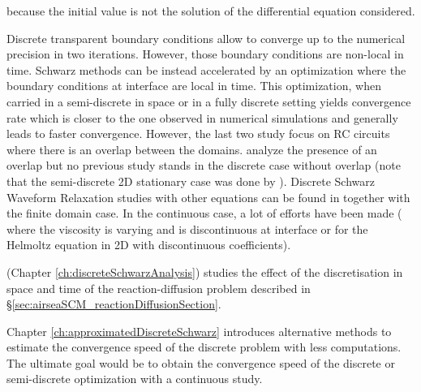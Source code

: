 because the initial value is not the solution of the
differential equation considered.
\par
Discrete transparent boundary conditions
\citep{zisowsky_discrete_2006} allow to converge up to the
numerical precision in two iterations.
However, those boundary conditions are non-local in time.
Schwarz methods can be instead accelerated
by an optimization \citep{gander_optimized_2006} where
the boundary conditions at interface are local in time.
This optimization, when carried in a semi-discrete in space
\citep{wu_semi-discrete_2014-1} or in a fully discrete setting
\citep{wu_optimized_2017-2} yields convergence rate which is
closer to the one observed in numerical simulations and
generally leads to faster convergence.
However, the last two study focus on RC circuits where there is
an overlap between the domains. \citep{gander_analysis_2018}
analyze the presence of an overlap but no previous study
stands in the discrete case without overlap (note that the
semi-discrete 2D stationary case was done by
\citep{gerardo-giorda_optimized_2005}).
Discrete Schwarz Waveform Relaxation studies with other equations
can be found in \citep{haynes_fully_2020} together with
the finite domain case.
In the continuous case, a lot of efforts have been made
(\citep{thery_analysis_2021} where the viscosity
is varying and is discontinuous at interface or
\citep{dubois_optimized_2007} for the Helmoltz equation in 2D
with discontinuous coefficients).
\par
\citep{clement_discrete_2022} (Chapter
\ref{ch:discreteSchwarzAnalysis}) studies the effect
of the discretisation in space and time of the reaction-diffusion
problem described in
\S\ref{sec:airseaSCM_reactionDiffusionSection}.
\par
Chapter \ref{ch:approximatedDiscreteSchwarz}
introduces alternative methods to estimate the convergence
speed of the discrete problem with less computations.
The ultimate goal would be to obtain the convergence speed of
the discrete or semi-discrete optimization with a continuous study.
\par
{}

